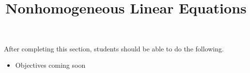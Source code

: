 \documentclass{ximera}
\title{Nonhomogeneous Linear Equations}
\begin{document}
\begin{abstract}
\end{abstract}

\maketitle

\begin{sectionOutcomes}

After completing this section, students should be able to do the following.

\begin{itemize}
	\item Objectives coming soon
\end{itemize}

\end{sectionOutcomes}
\end{document}
